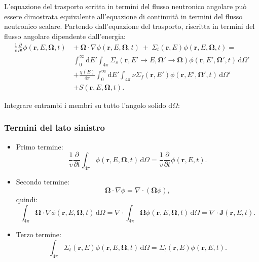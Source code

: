 L’equazione del trasporto scritta in termini del flusso neutronico angolare può essere dimostrata equivalente all’equazione di continuità in termini del flusso neutronico scalare. Partendo dall'equazione del trasporto, riscritta in termini del flusso angolare dipendente dall’energia:
\begin{equation}
	\begin{aligned}
		\frac{1}{v} \frac{\partial}{\partial t} \phi (\mathbf{r}, E, \boldsymbol{\Omega}, t)\ &+\ \boldsymbol{\Omega} \cdot \nabla \phi (\mathbf{r}, E, \boldsymbol{\Omega}, t)\ +\ \Sigma_t (\mathbf{r}, E) \phi (\mathbf{r}, E, \boldsymbol{\Omega}, t) =\\
		&\int_0^\infty \mathrm{d}E' \int_{4\pi} \Sigma_s (\mathbf{r}, E' \rightarrow E, \boldsymbol{\Omega}' \rightarrow \boldsymbol{\Omega}) \phi (\mathbf{r}, E', \boldsymbol{\Omega}', t) \, \mathrm{d}\Omega' \\
		&+ \frac{\chi(E)}{4\pi} \int_0^\infty \mathrm{d}E' \int_{4\pi} \nu \Sigma_f (\mathbf{r}, E') \phi (\mathbf{r}, E', \boldsymbol{\Omega}', t) \, \mathrm{d}\Omega' \\
		&+ S (\mathbf{r}, E, \boldsymbol{\Omega}, t).
	\end{aligned}
\end{equation}

Integrare entrambi i membri su tutto l’angolo solido $\mathrm{d}\Omega$:

\subsubsection{Termini del lato sinistro}
\begin{itemize}[nosep, leftmargin=*]
	\item Primo termine:
	\begin{equation}
		\frac{1}{v} \frac{\partial}{\partial t} \int_{4\pi} \phi (\mathbf{r}, E, \boldsymbol{\Omega}, t) \, \mathrm{d}\Omega = \frac{1}{v} \frac{\partial}{\partial t} \phi (\mathbf{r}, E, t).
	\end{equation}
	
	\item Secondo termine:
	\begin{equation}
		\boldsymbol{\Omega} \cdot \nabla \phi = \nabla \cdot (\boldsymbol{\Omega} \phi),
	\end{equation}
	quindi:
	\begin{equation}
		\int_{4\pi} \boldsymbol{\Omega} \cdot \nabla \phi (\mathbf{r}, E, \boldsymbol{\Omega}, t) \, \mathrm{d}\Omega = \nabla \cdot \int_{4\pi} \boldsymbol{\Omega} \phi (\mathbf{r}, E, \boldsymbol{\Omega}, t) \, \mathrm{d}\Omega = \nabla \cdot \mathbf{J} (\mathbf{r}, E, t).
	\end{equation}
	
	\item Terzo termine:
	\begin{equation}
		\int_{4\pi} \Sigma_t(\mathbf{r}, E) \phi(\mathbf{r}, E, \boldsymbol{\Omega}, t) \, \mathrm{d}\Omega = \Sigma_t(\mathbf{r}, E) \phi(\mathbf{r}, E, t).
	\end{equation}
\end{itemize}

